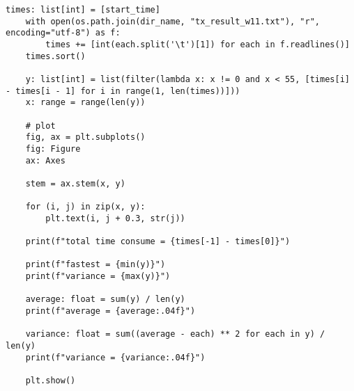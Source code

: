 \begin{appendices}
\begin{lstlisting}[caption={跨链转账测试的数据可视化}, label={lst:跨链转账测试的数据可视化}]
    times: list[int] = [start_time]
    with open(os.path.join(dir_name, "tx_result_w11.txt"), "r", encoding="utf-8") as f:
        times += [int(each.split('\t')[1]) for each in f.readlines()]
    times.sort()

    y: list[int] = list(filter(lambda x: x != 0 and x < 55, [times[i] - times[i - 1] for i in range(1, len(times))]))
    x: range = range(len(y))

    # plot
    fig, ax = plt.subplots()
    fig: Figure
    ax: Axes

    stem = ax.stem(x, y)

    for (i, j) in zip(x, y):
        plt.text(i, j + 0.3, str(j))

    print(f"total time consume = {times[-1] - times[0]}")

    print(f"fastest = {min(y)}")
    print(f"variance = {max(y)}")

    average: float = sum(y) / len(y)
    print(f"average = {average:.04f}")

    variance: float = sum((average - each) ** 2 for each in y) / len(y)
    print(f"variance = {variance:.04f}")

    plt.show()

  \end{lstlisting}
\end{appendices}

